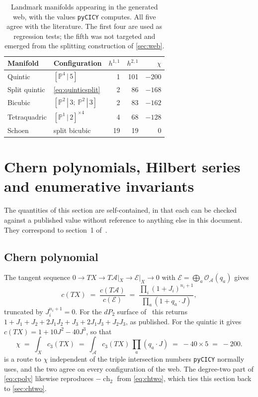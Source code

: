 \documentclass[11pt,a4paper]{article}
\newcommand{\PP}{\mathbb{P}}
\newcommand{\cO}{\mathcal{O}}
\newcommand{\ch}{\operatorname{ch}}
\theoremstyle{definition}
\begin{document}
\begin{table}[t]
\centering
\begin{tabular}{llrrr}
\toprule
Manifold & Configuration & $h^{1,1}$ & $h^{2,1}$ & $\chi$ \\
\midrule
Quintic          & $[\PP^4\,|\,5]$                       & 1  & 101 & $-200$\\
Split quintic    & \cref{eq:quinticsplit}                & 2  & 86  & $-168$\\
Bicubic          & $[\PP^2\,|\,3;\ \PP^2\,|\,3]$          & 2  & 83  & $-162$\\
Tetraquadric     & $[\PP^1\,|\,2]^{\times 4}$             & 4  & 68  & $-128$\\
Schoen           & split bicubic                          & 19 & 19  & $0$\\
\bottomrule
\end{tabular}
\caption{Landmark manifolds appearing in the generated web, with the values
\texttt{pyCICY} computes. All five agree with the literature. The first four
are used as regression tests; the fifth was not targeted and emerged from the
splitting construction of \cref{sec:web}.}
\label{tab:landmarks}
\end{table}

\section{Chern polynomials, Hilbert series and enumerative invariants}
\label{sec:enumerative}

The quantities of this section are self-contained, in that each can be
checked against a published value without reference to anything else in this
document. They correspond to section~1 of~\cite{Anderson2026}.

\subsection{Chern polynomial}

The tangent sequence $0 \to TX \to T\mathcal{A}|_X \to \mathcal{E}|_X \to 0$
with $\mathcal{E} = \bigoplus_a \cO_{\mathcal{A}}(q_a)$ gives
%
\begin{equation}
c(TX) \;=\; \frac{c(T\mathcal{A})}{c(\mathcal{E})}
\;=\; \frac{\prod_i (1+J_i)^{n_i+1}}{\prod_a (1 + q_a\!\cdot\!J)} ,
\label{eq:cpoly}
\end{equation}
%
truncated by $J_i^{n_i+1}=0$. For the $dP_2$ surface of~\cite{Anderson2026}
this returns $1 + J_1 + J_2 + 2J_1J_2 + J_3 + 2J_1J_3 + J_2J_3$, as
published. For the quintic it gives $c(TX) = 1 + 10J^2 - 40J^3$, so that
%
\begin{equation}
\chi \;=\; \int_X c_3(TX) \;=\; \int_{\mathcal{A}} c_3(TX)\,\prod_a
(q_a\!\cdot\!J) \;=\; -40 \times 5 \;=\; -200 .
\label{eq:eulerc3}
\end{equation}
%
 is a route to $\chi$ independent of the triple intersection
numbers \texttt{pyCICY} normally uses, and the two agree on every
configuration of the web. The degree-two part of \cref{eq:cpoly} likewise
reproduces $-\ch_2$ from \cref{eq:chtwo}, which ties this section back to
\cref{sec:chtwo}.
\end{document}
